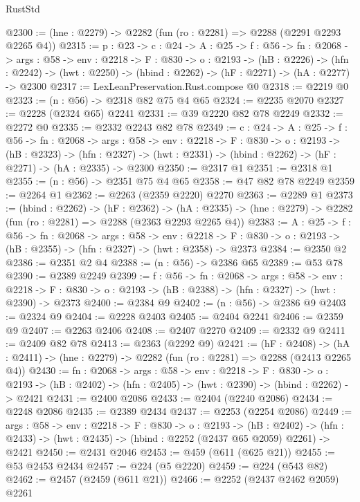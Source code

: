 \begin{lexlean}{RustStd}
\begin{coremodule}
@2300 := (hne : @2279) -> @2282 (fun (ro : @2281) => @2288 (@2291 @2293 @2265 @4))
@2315 := {p : @23} ->
  {c : @24} ->
  {A : @25} ->
  {f : @56} ->
  {fn : @2068} ->
  {args : @58} ->
  {env : @2218} ->
  {F : @830} ->
  {o : @2193} ->
  (hB : @2226) ->
  (hfn : @2242) -> (hwt : @2250) -> (hbind : @2262) -> (hF : @2271) -> (hA : @2277) -> @2300
@2317 := LexLeanPreservation.Rust.compose @0
@2318 := @2219 @0
@2323 := (n : @56) -> @2318 @82 @75 @4 @65
@2324 := @2235 @2070
@2327 := @2228 (@2324 @65) @2241
@2331 := @39 @2220 @82 @78 @2249
@2332 := @2272 @0
@2335 := @2332 @2243 @82 @78
@2349 := {c : @24} ->
  {A : @25} ->
  {f : @56} ->
  {fn : @2068} ->
  {args : @58} ->
  {env : @2218} ->
  {F : @830} ->
  {o : @2193} ->
  (hB : @2323) ->
  (hfn : @2327) -> (hwt : @2331) -> (hbind : @2262) -> (hF : @2271) -> (hA : @2335) -> @2300
@2350 := @2317 @1
@2351 := @2318 @1
@2355 := (n : @56) -> @2351 @75 @4 @65
@2358 := @47 @82 @78 @2249
@2359 := @2264 @1
@2362 := @2263 (@2359 @2220) @2270
@2363 := @2289 @1
@2373 := (hbind : @2262) ->
  (hF : @2362) ->
  (hA : @2335) -> (hne : @2279) -> @2282 (fun (ro : @2281) => @2288 (@2363 @2293 @2265 @4))
@2383 := {A : @25} ->
  {f : @56} ->
  {fn : @2068} ->
  {args : @58} ->
  {env : @2218} ->
  {F : @830} -> {o : @2193} -> (hB : @2355) -> (hfn : @2327) -> (hwt : @2358) -> @2373
@2384 := @2350 @2
@2386 := @2351 @2 @4
@2388 := (n : @56) -> @2386 @65
@2389 := @53 @78
@2390 := @2389 @2249
@2399 := {f : @56} ->
  {fn : @2068} ->
  {args : @58} ->
  {env : @2218} ->
  {F : @830} -> {o : @2193} -> (hB : @2388) -> (hfn : @2327) -> (hwt : @2390) -> @2373
@2400 := @2384 @9
@2402 := (n : @56) -> @2386 @9
@2403 := @2324 @9
@2404 := @2228 @2403
@2405 := @2404 @2241
@2406 := @2359 @9
@2407 := @2263 @2406
@2408 := @2407 @2270
@2409 := @2332 @9
@2411 := @2409 @82 @78
@2413 := @2363 (@2292 @9)
@2421 := (hF : @2408) ->
  (hA : @2411) -> (hne : @2279) -> @2282 (fun (ro : @2281) => @2288 (@2413 @2265 @4))
@2430 := {fn : @2068} ->
  {args : @58} ->
  {env : @2218} ->
  {F : @830} ->
  {o : @2193} -> (hB : @2402) -> (hfn : @2405) -> (hwt : @2390) -> (hbind : @2262) -> @2421
@2431 := @2400 @2086
@2433 := @2404 (@2240 @2086)
@2434 := @2248 @2086
@2435 := @2389 @2434
@2437 := @2253 (@2254 @2086)
@2449 := {args : @58} ->
  {env : @2218} ->
  {F : @830} ->
  {o : @2193} ->
  (hB : @2402) -> (hfn : @2433) -> (hwt : @2435) -> (hbind : @2252 (@2437 @65 @2059) @2261) -> @2421
@2450 := @2431 @2046
@2453 := @459 (@611 (@625 @21))
@2455 := @53 @2453 @2434
@2457 := @224 (@5 @2220)
@2459 := @224 (@543 @82)
@2462 := @2457 (@2459 (@611 @21))
@2466 := @2252 (@2437 @2462 @2059) @2261

\end{coremodule}
\end{lexlean}

